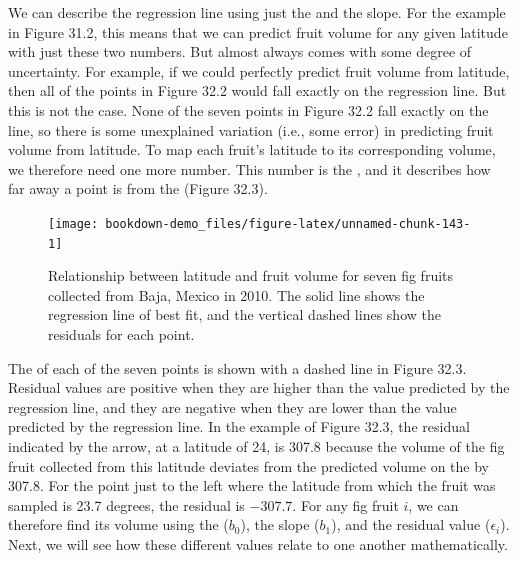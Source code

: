 \documentclass[
  openany]{krantz}
\begin{document}
We can describe the regression line using just the  and the slope.
For the example in Figure 31.2, this means that we can predict fruit volume for any given latitude with just these two numbers.
But  almost always comes with some degree of uncertainty.
For example, if we could perfectly predict fruit volume from latitude, then all of the points in Figure 32.2 would fall exactly on the regression line.
But this is not the case.
None of the seven points in Figure 32.2 fall exactly on the line, so there is some unexplained variation (i.e., some error) in predicting fruit volume from latitude.
To map each fruit's latitude to its corresponding volume, we therefore need one more number.
This number is the \textbf{}, and it describes how far away a point is from the  (Figure 32.3).

\begin{figure}
\texttt{[image: bookdown-demo\_files/figure-latex/unnamed-chunk-143-1]} \caption{Relationship between latitude and fruit volume for seven fig fruits collected from Baja, Mexico in 2010. The solid line shows the regression line of best fit, and the vertical dashed lines show the residuals for each point.}\label{fig:unnamed-chunk-143}
\end{figure}

The  of each of the seven points is shown with a dashed line in Figure 32.3.
Residual values are positive when they are higher than the value predicted by the regression line, and they are negative when they are lower than the value predicted by the regression line.
In the example of Figure 32.3, the residual indicated by the arrow, at a latitude of 24, is 307.8 because the volume of the fig fruit collected from this latitude deviates from the predicted volume on the  by 307.8.
For the point just to the left where the latitude from which the fruit was sampled is 23.7 degrees, the residual is \(-307.7\).
For any fig fruit \(i\), we can therefore find its volume using the  (\(b_{0}\)), the slope (\(b_{1}\)), and the residual value (\(\epsilon_{i}\)).
Next, we will see how these different values relate to one another mathematically.

\hypertarget{section-3}{%
\section{\texorpdfstring{}{}}\label{section-3}}
\end{document}
